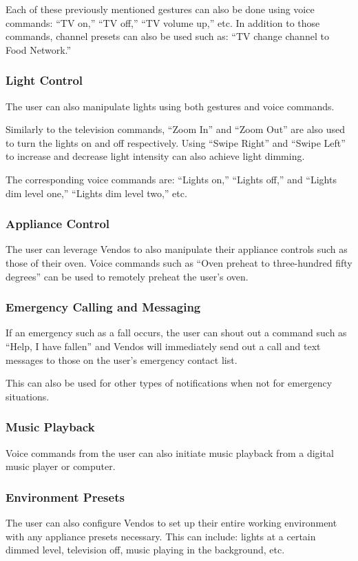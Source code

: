 \documentclass{chi-ext}
\begin{document}
Each of these previously mentioned gestures can also be done using voice commands: “TV on,” “TV off,” “TV volume up,” etc.
In addition to those commands, channel presets can also be used such as: “TV change channel to Food Network.”
 
\subsubsection{Light Control}
The user can also manipulate lights using both gestures and voice commands.
 
Similarly to the television commands, ``Zoom In'' and ``Zoom Out'' are also used to turn the lights on and off respectively.
Using “Swipe Right” and “Swipe Left” to increase and decrease light intensity can also achieve light dimming.
 
The corresponding voice commands are: ``Lights on,'' ``Lights off,'' and ``Lights dim level one,'' ``Lights dim level two,'' etc.
 
\subsubsection{Appliance Control}
The user can leverage Vendos to also manipulate their appliance controls such as those of their oven.
Voice commands such as ``Oven preheat to three-hundred fifty degrees'' can be used to remotely preheat the user's oven.
 
\subsubsection{Emergency Calling and Messaging}
If an emergency such as a fall occurs, the user can shout out a command such as ``Help, I have fallen'' and Vendos will immediately send out a call and text messages to those on the user's emergency contact list.
 
This can also be used for other types of notifications when not for emergency situations.
 
\subsubsection{Music Playback}
Voice commands from the user can also initiate music playback from a digital music player or computer.
 
\subsubsection{Environment Presets}
The user can also configure Vendos to set up their entire working environment with any appliance presets necessary.
This can include: lights at a certain dimmed level, television off, music playing in the background, etc.
\end{document}
